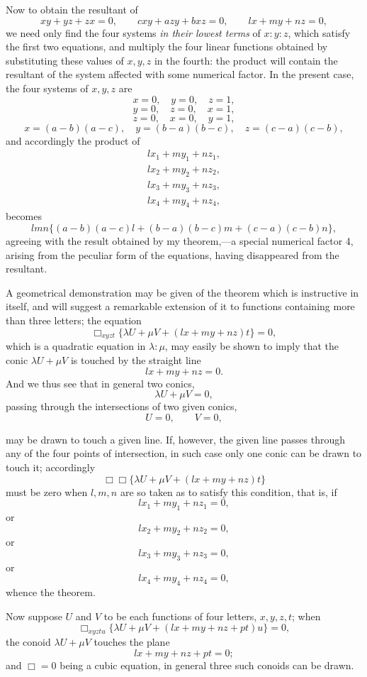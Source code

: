 \documentclass[11pt]{article}
\newcommand{\sourcepage}[1]{\marginpar{\scriptsize p.~#1}}
\begin{document}
\sourcepage{141}
Now to obtain the resultant of
\[
xy+yz+zx=0,\qquad
cxy+azy+bxz=0,\qquad
lx+my+nz=0,
\]
we need only find the four systems \emph{in their lowest terms} of $x:y:z$, which satisfy the first two equations, and multiply the four linear functions obtained by substituting these values of $x,y,z$ in the fourth: the product will contain the resultant of the system affected with some numerical factor. In the present case, the four systems of $x,y,z$ are
\[
x=0,\quad y=0,\quad z=1,
\]
\[
y=0,\quad z=0,\quad x=1,
\]
\[
z=0,\quad x=0,\quad y=1,
\]
\[
x=(a-b)(a-c),\quad y=(b-a)(b-c),\quad z=(c-a)(c-b),
\]
and accordingly the product of
\[
\begin{gathered}
lx_1+my_1+nz_1,\\
lx_2+my_2+nz_2,\\
lx_3+my_3+nz_3,\\
lx_4+my_4+nz_4,
\end{gathered}
\]
becomes
\[
lmn\{(a-b)(a-c)l+(b-a)(b-c)m+(c-a)(c-b)n\},
\]
agreeing with the result obtained by my theorem,---a special numerical factor 4, arising from the peculiar form of the equations, having disappeared from the resultant.

A geometrical demonstration may be given of the theorem which is instructive in itself, and will suggest a remarkable extension of it to functions containing more than three letters; the equation
\[
\Box_{xyzt}\{\lambda U+\mu V+(lx+my+nz)t\}=0,
\]
which is a quadratic equation in $\lambda:\mu$, may easily be shown to imply that the conic $\lambda U+\mu V$ is touched by the straight line
\[
lx+my+nz=0.
\]
And we thus see that in general two conics,
\[
\lambda U+\mu V=0,
\]
passing through the intersections of two given conics,
\[
U=0,\qquad V=0,
\]

\sourcepage{142}
may be drawn to touch a given line. If, however, the given line passes through any of the four points of intersection, in such case only one conic can be drawn to touch it; accordingly
\[
\Box\Box\{\lambda U+\mu V+(lx+my+nz)t\}
\]
must be zero when $l,m,n$ are so taken as to satisfy this condition, that is, if
\[
lx_1+my_1+nz_1=0,
\]
or
\[
lx_2+my_2+nz_2=0,
\]
or
\[
lx_3+my_3+nz_3=0,
\]
or
\[
lx_4+my_4+nz_4=0,
\]
whence the theorem.

Now suppose $U$ and $V$ to be each functions of four letters, $x,y,z,t$; when
\[
\Box_{xyztu}\{\lambda U+\mu V+(lx+my+nz+pt)u\}=0,
\]
the conoid $\lambda U+\mu V$ touches the plane
\[
lx+my+nz+pt=0;
\]
and $\Box=0$ being a cubic equation, in general three such conoids can be drawn.
\end{document}
